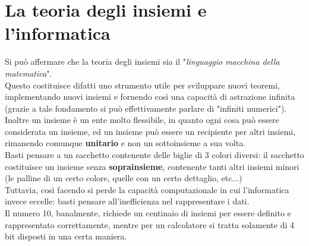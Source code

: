 \documentclass[12pt]{article}
\begin{document}
\section{La teoria degli insiemi e l'informatica}
Si può affermare che la teoria degli insiemi sia il "\textit{linguaggio macchina della matematica}".\\
Questo costituisce difatti uno strumento utile per sviluppare nuovi teoremi, implementando nuovi insiemi e fornendo così una capacità di astrazione infinita (grazie a tale fondamento si può effettivamente parlare di "infiniti numerici").\\
Inoltre un insieme è un ente molto flessibile, in quanto ogni cosa può essere considerata un insieme, ed un insieme può essere un recipiente per altri insiemi, rimanendo comunque \textbf{unitario} e non un sottoinsieme a sua volta.\\
Basti pensare a un sacchetto contenente delle biglie di 3 colori diversi: il sacchetto costituisce un insieme senza \textbf{soprainsieme}, contenente tanti altri insiemi minori (le palline di un certo colore, quelle con un certo dettaglio, etc...)\\
Tuttavia, così facendo si perde la capacità computazionale in cui l'informatica invece eccelle: basti pensare all'inefficienza nel rappresentare i dati.\\
Il numero 10, banalmente, richiede un centinaio di insiemi per essere definito e rappresentato correttamente, mentre per un calcolatore si tratta solamente di 4 bit disposti in una certa maniera.
\end{document}
